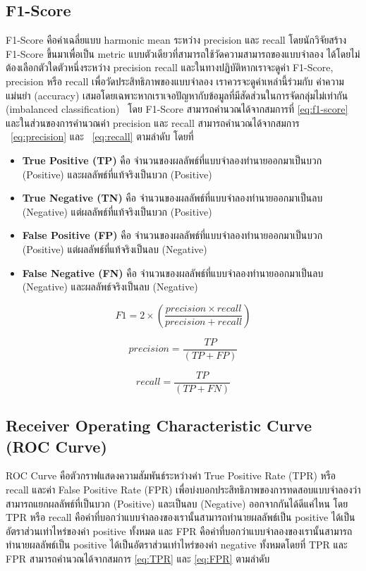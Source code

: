 \subsection{F1-Score}
F1-Score คือค่าเฉลี่ยแบบ harmonic mean ระหว่าง precision และ recall โดยนักวิจัยสร้าง F1-Score ขึ้นมาเพื่อเป็น metric แบบตัวเดียวที่สามารถใช้วัดความสามารถของแบบจำลอง ได้โดยไม่ต้องเลือกตัวใดตัวหนึ่งระหว่าง precision  recall และในทางปฏิบัติหากเราจะดูค่า F1-Score, precision หรือ recall เพื่อวัดประสิทธิภาพของแบบจำลอง 
เราควรจะดูค่าเหล่านี้ร่วมกับ ค่าความแม่นยำ (accuracy) เสมอโดยเฉพาะหากเราเจอปัญหากับข้อมูลที่มีสัดส่วนในการจัดกลุ่มไม่เท่ากัน (imbalanced classification)~\cite{Imbalanced_dealing_medium} โดย F1-Score สามารถคำนวณได้จากสมการที่ \ref{eq:f1-score} 
และในส่วนของการคำนวณค่า precision และ recall สามารถคำนวณได้จากสมการ ~\ref{eq:precision} และ ~\ref{eq:recall} ตามลำดับ โดยที่\par

\begin{itemize}
    \item\textbf{True Positive (TP)} คือ จำนวนของผลลัพธ์ที่แบบจำลองทำนายออกมาเป็นบวก (Positive) และผลลัพธ์ที่แท้จริงเป็นบวก (Positive)
    \item\textbf{True Negative (TN)} คือ จำนวนของผลลัพธ์ที่แบบจำลองทำนายออกมาเป็นลบ (Negative) แต่ผลลัพธ์ที่แท้จริงเป็นบวก (Positive)
    \item\textbf{False Positive (FP)} คือ จำนวนของผลลัพธ์ที่แบบจำลองทำนายออกมาเป็นบวก (Positive) แต่ผลลัพธ์ที่แท้จริงเป็นลบ (Negative)
    \item\textbf{False Negative (FN)} คือ จำนวนของผลลัพธ์ที่แบบจำลองทำนายออกมาเป็นลบ (Negative) และผลลัพธ์จริงเป็นลบ (Negative)
\end{itemize}

\begin{equation}
    F1 = 2\times\left(\frac{precision \times recall}{precision  + recall}\right)
    \label{eq:f1-score}
\end{equation}

\begin{equation}
    precision = \frac{TP}{(TP + FP)}
    \label{eq:precision}
\end{equation}

\begin{equation}
    recall = \frac{TP}{(TP + FN)}
    \label{eq:recall}
\end{equation}

\subsection{Receiver Operating Characteristic Curve (ROC Curve)}
ROC Curve คือตัวกราฟแสดงความสัมพันธ์ระหว่างค่า True Positive Rate (TPR) หรือ recall และค่า False Positive Rate (FPR) เพื่อบ่งบอกประสิทธิภาพของการทดสอบแบบจำลองว่า
สามารถแยกผลลัพธ์ที่เป็นบวก (Positive) และเป็นลบ (Negative) ออกจากกันได้ดีแค่ไหน โดย TPR หรือ recall คือค่าที่บอกว่าแบบจำลองของเรานั้นสามารถทำนายผลลัพธ์เป็น positive ได้เป็นอัตราส่วนเท่าไหร่ของค่า positive ทั้งหมด และ FPR คือค่าที่บอกว่าแบบจำลองของเรานั้นสามารถทำนายผลลัพธ์เป็น positive
ได้เป็นอัตราส่วนเท่าไหร่ของค่า negative ทั้งหมดโดยที่ TPR และ FPR สามารถคำนวณได้จากสมการ \ref{eq:TPR} และ \ref{eq:FPR} ตามลำดับ


